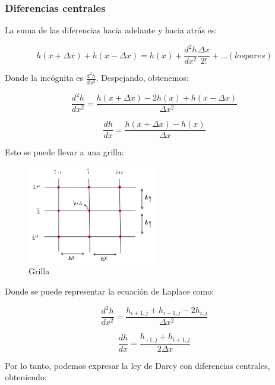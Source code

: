\subsubsection{Diferencias centrales}

La suma de las diferencias hacia adelante y hacia atrás es:

\begin{equation}
    h(x + \Delta x) + h(x - \Delta x) = h(x) + \frac{d^2h}{dx^2}\frac{\Delta x}{2!} + ...(los pares)
\end{equation}

Donde la incógnita es $\frac{d^2h}{dx^2}$. Despejando, obtenemos:

\begin{equation}
    \frac{d^2h}{dx^2} = \frac{h(x + \Delta x) - 2h(x) + h(x - \Delta x)}{\Delta x^2}
\end{equation}

\begin{equation}
    \frac{dh}{dx} = \frac{h(x + \Delta x) - h(x)}{\Delta x}
\end{equation}

Esto se puede llevar a una grilla:

\begin{figure}[H]
    \centering
    \includegraphics[width=0.5\textwidth]{FOTOS/grilla.jpg}
    \caption{Grilla}
\end{figure}

Donde se puede representar la ecuación de Laplace como:

\begin{equation}
    \frac{d^2h}{dx^2} = \frac{h_{i+1,j} + h_{i-1,j} - 2h_{i,j}}{\Delta x^2}
\end{equation}

\begin{equation}
    \frac{dh}{dx} = \frac{h_{+1,j} + h_{i+1,j}}{2\Delta x}
\end{equation}

Por lo tanto, podemos expresar la ley de Darcy con diferencias centrales, obteniendo:

